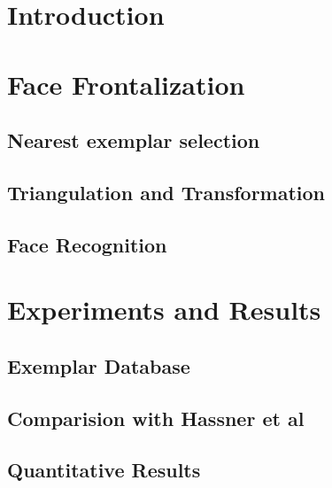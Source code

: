 % 
 
\section{Introduction}


% 

\section{Face Frontalization}


\subsection{Nearest exemplar selection}


\subsection{Triangulation and Transformation}


\subsection{Face Recognition}


\section{Experiments and Results}


\subsection{Exemplar Database}


\subsection{Comparision with Hassner et al}


\subsection{Quantitative Results}


%
